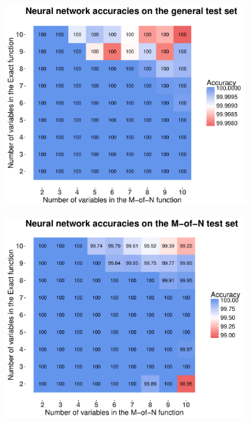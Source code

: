 \documentclass[letterpaper]{article} %
\begin{document}
 \begin{figure}
    \centering
    \begin{subfigure}[t]{0.45\textwidth}
        \includegraphics[width = 1 \linewidth]{Figures/Heatmap_ME_NN_general.pdf}
		\caption{}       
        \label{fig:Heatmap_ME_NN_general}
    \end{subfigure}%

    \begin{subfigure}[t]{0.45\textwidth}
        \includegraphics[width = 1 \linewidth]{Figures/Heatmap_ME_NN_M.pdf}
		\caption{}       
        \label{fig:Heatmap_ME_NN_M}
    \end{subfigure}%


\end{figure}
\end{document}
